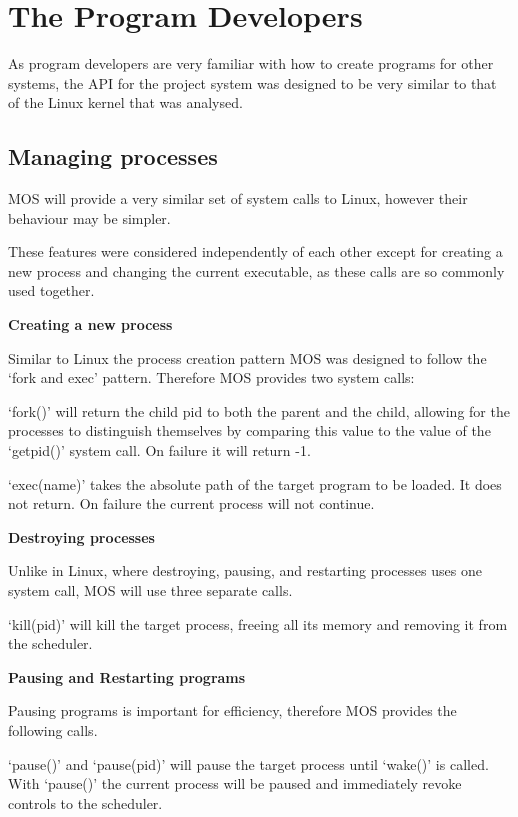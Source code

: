 \documentclass[a4paper]{report}
\begin{document}
\clearpage

\section{The Program Developers}

As program developers are very familiar with how to create programs for other systems, the API for the project system was designed to be very similar to that of the Linux kernel that was analysed.

\subsection{Managing processes}

MOS will provide a very similar set of system calls to Linux, however their behaviour may be simpler.

These features were considered independently of each other except for creating a new process and changing the current executable, as these calls are so commonly used together.

\textbf{Creating a new process}

Similar to Linux the process creation pattern MOS was designed to follow the `fork and exec' pattern. Therefore MOS provides two system calls:

`fork()' will return the child pid to both the parent and the child, allowing for the processes to distinguish themselves by comparing this value to the value of the `get\textunderscore pid()' system call. On failure it will return -1.

`exec(name)' takes the absolute path of the target program to be loaded. It does not return. On failure the current process will not continue.

\textbf{Destroying processes}

Unlike in Linux, where destroying, pausing, and restarting processes uses one system call, MOS will use three separate calls.

`kill(pid)' will kill the target process, freeing all its memory and removing it from the scheduler.

\textbf{Pausing and Restarting programs}

Pausing programs is important for efficiency, therefore MOS provides the following calls.

`pause()' and `pause(pid)' will pause the target process until `wake()' is called. With `pause()' the current process will be paused and immediately revoke controls to the scheduler.
\end{document}
